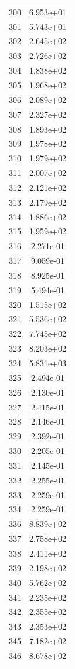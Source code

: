 \documentclass[12pt]{article}
\begin{document}
\begin{longtable}{@{}cc@{}}
300 & 6.953e+01 \\
301 & 5.743e+01 \\
302 & 2.645e+02 \\
303 & 2.726e+02 \\
304 & 1.838e+02 \\
305 & 1.968e+02 \\
306 & 2.089e+02 \\
307 & 2.327e+02 \\
308 & 1.893e+02 \\
309 & 1.978e+02 \\
310 & 1.979e+02 \\
311 & 2.007e+02 \\
312 & 2.121e+02 \\
313 & 2.179e+02 \\
314 & 1.886e+02 \\
315 & 1.959e+02 \\
316 & 2.271e-01 \\
317 & 9.059e-01 \\
318 & 8.925e-01 \\
319 & 5.494e-01 \\
320 & 1.515e+02 \\
321 & 5.536e+02 \\
322 & 7.745e+02 \\
323 & 8.203e+02 \\
324 & 5.831e+03 \\
325 & 2.494e-01 \\
326 & 2.130e-01 \\
327 & 2.415e-01 \\
328 & 2.146e-01 \\
329 & 2.392e-01 \\
330 & 2.205e-01 \\
331 & 2.145e-01 \\
332 & 2.255e-01 \\
333 & 2.259e-01 \\
334 & 2.259e-01 \\
336 & 8.839e+02 \\
337 & 2.758e+02 \\
338 & 2.411e+02 \\
339 & 2.198e+02 \\
340 & 5.762e+02 \\
341 & 2.235e+02 \\
342 & 2.355e+02 \\
343 & 2.353e+02 \\
345 & 7.182e+02 \\
346 & 8.678e+02 \\

\end{longtable}
\end{document}
